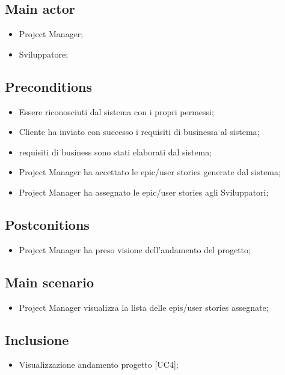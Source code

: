\documentclass{article}
\begin{document}
    \subsection*{Main actor}
        \begin{itemize}
            \item Project Manager;
            \item  Sviluppatore;
        \end{itemize}
        
    \subsection*{Preconditions}
        \begin{itemize}
            \item Essere riconosciuti dal sistema con i propri permessi;
            \item Cliente ha inviato con successo i requisiti di businessa al sistema;
            \item requisiti di business sono stati elaborati dal sistema;
            \item Project Manager ha accettato le epic/user stories generate dal sistema;
            \item Project Manager ha assegnato le epic/user stories agli Sviluppatori;
        \end{itemize}
        
    \subsection*{Postconitions}
    \begin{itemize}
        \item Project Manager ha preso visione dell'andamento del progetto;
    \end{itemize}
    
    \subsection*{Main scenario}
        \begin{itemize}
            \item Project Manager visualizza la lista delle epis/user stories assegnate;
        \end{itemize}
        
    \subsection*{Inclusione}
        \begin{itemize}
            \item Visualizzazione andamento progetto [UC4];
        \end{itemize}
\end{document}
